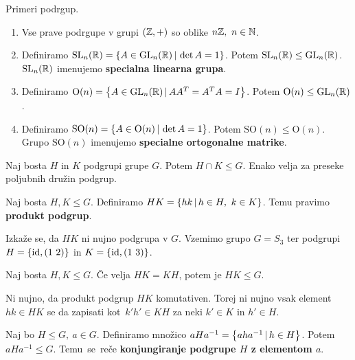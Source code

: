 \begin{primer}
    Primeri podrgup.
    \begin{enumerate}
        \item Vse prave podrgupe v grupi $(\mathbb{Z}, +)$ so oblike $n\mathbb{Z}, \ n \in \mathbb{N}$.
        \item Definiramo $\operatorname{SL}_n(\mathbb{R}) = \left\{A \in \operatorname{GL}_n(\mathbb{R}) \,|\, \det A = 1\right\}$. Potem $\operatorname{SL}_n(\mathbb{R}) \leq \operatorname{GL}_n(\mathbb{R})$. $\operatorname{SL}_n(\mathbb{R})$ imenujemo \textbf{specialna linearna grupa}.
        \item Definiramo $\text{O}(n) = \left\{A \in \operatorname{GL}_n(\mathbb{R}) \,|\, AA^T = A^TA = I\right\}$. Potem $\text{O}(n) \leq \operatorname{GL}_n(\mathbb{R})$.
        \item Definiramo $\text{SO}(n) = \left\{A \in \text{O}(n) \,|\, \det A = 1\right\}$. Potem $\text{SO}(n) \leq \text{O}(n)$. Grupo $\text{SO}(n)$ imenujemo \textbf{specialne ortogonalne matrike}.
    \end{enumerate}
\end{primer}

\newpage
\begin{trditev}
    Naj bosta $H$ in $K$ podgrupi grupe $G$. Potem $H \cap K \leq G$. Enako velja za preseke poljubnih družin podgrup.
\end{trditev}

\begin{definicija}
    Naj bosta $H, K \leq G$. Definiramo $HK = \left\{hk \,|\, h \in H, \ k \in K\right\}$. Temu pravimo \textbf{produkt podgrup}.
\end{definicija}

\begin{zgled}
    Izkaže se, da $H K$ ni nujno podgrupa v $G$. Vzemimo grupo $G = S_3$ ter podgrupi $H =\left\{\operatorname{id}, (1\ 2)\right\}$ in $K = \left\{\operatorname{id}, (1\ 3)\right\}$.
\end{zgled}

\begin{trditev}
    Naj bosta $H, K \leq G$. Če velja $HK = KH$, potem je $HK \leq G$.
\end{trditev}

\begin{opomba}
    Ni nujno, da produkt podgrup $HK$ komutativen. Torej ni nujno vsak element $hk \in HK$ se da zapisati kot~$k'h' \in KH$ za neki $k' \in K$ in $h' \in H$.
\end{opomba}

\begin{definicija}
    Naj bo $H \leq G, \ a \in G$. Definiramo množico $aHa^{-1} = \left\{aha^{-1} \,|\, h \in H\right\}$. Potem $aHa^{-1} \leq G$. Temu~se~reče \textbf{konjungiranje podgrupe $H$ z elementom $a$}.
\end{definicija}

